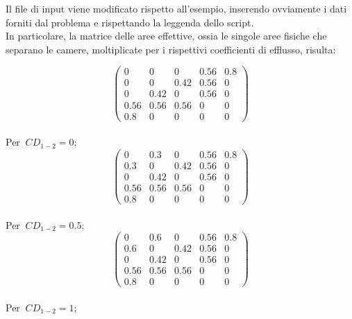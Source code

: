 \documentclass{article}
\begin{document}
        Il file di input viene modificato rispetto all'esempio, 
        inserendo ovviamente i dati forniti dal problema e rispettando la leggenda
        dello script.\\ 
        In particolare, la matrice delle aree effettive, ossia le singole aree fisiche che separano le camere, moltiplicate
        per i rispettivi coefficienti di efflusso, risulta: \\
        \begin{center}  
            \[
            \begin{pmatrix}
                0    & 0    & 0        & 0.56 & 0.8\\ 
                0    & 0    & 0.42     & 0.56 & 0\\ 
                0    & 0.42 & 0        & 0.56 & 0\\ 
                0.56 & 0.56 & 0.56     & 0    & 0\\
                0.8  & 0    & 0        & 0    & 0 
            \end{pmatrix}
            \]
            \\ 
            Per $\ CD_{1-2} = 0;$ \
            \\ 
            \[
            \begin{pmatrix}
                0    & 0.3  & 0        & 0.56 & 0.8\\ 
                0.3  & 0    & 0.42     & 0.56 & 0\\ 
                0    & 0.42 & 0        & 0.56 & 0\\ 
                0.56 & 0.56 & 0.56     & 0    & 0\\
                0.8  & 0    & 0        & 0    & 0 
            \end{pmatrix}
            \]
            \\ 
            Per $\ CD_{1-2} = 0.5;$ \
            \\ 
            \[
            \begin{pmatrix}
                0    & 0.6  & 0        & 0.56 & 0.8\\ 
                0.6  & 0    & 0.42     & 0.56 & 0\\ 
                0    & 0.42 & 0        & 0.56 & 0\\ 
                0.56 & 0.56 & 0.56     & 0    & 0\\
                0.8  & 0    & 0        & 0    & 0 
            \end{pmatrix}
            \]
            \\ 
            Per $\ CD_{1-2} = 1;$ \
        \end{center}    
        \clearpage
\end{document}
